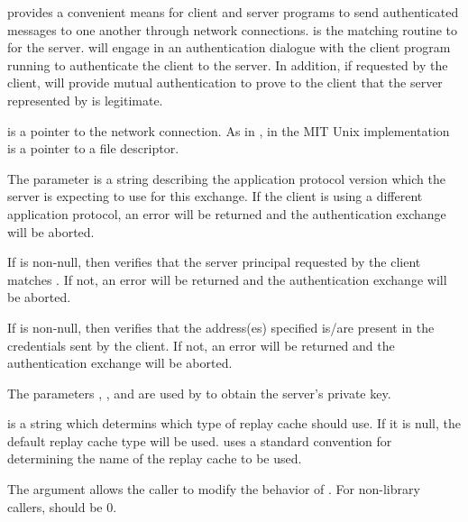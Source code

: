  provides a convenient means for client and
server programs to send authenticated messages to one another through
network connections.   is the matching routine
to  for the server.  
will engage in an authentication dialogue with the
client program running  to authenticate the
client to the server.  In addition, if requested by the client,
 will provide mutual authentication to
prove to the client that the server represented by
 is legitimate. 

 is a pointer to the network connection.  As in
, in the MIT Unix implementation
 is a pointer to a file descriptor.

The parameter  is a string describing the
application protocol version which the server is expecting to use for
this exchange.  If the client is using a different application protocol,
an error will be returned and the authentication exchange will be
aborted.

If  is non-null, then 
verifies that the server principal requested by the client matches
.  If not, an error will be returned and the
authentication exchange will be aborted.

If  is non-null, then 
verifies that the address(es) specified is/are present in the
credentials sent by the client.  If not, an error will be returned and
the authentication exchange will be aborted.

The parameters , , and
 are used by  to obtain the
server's private key.

 is a string which determins which type of replay
cache  should use.  If it is null, the default
replay cache type will be used.   uses a
standard convention for determining the name of the replay cache to be
used.

The  argument allows the caller to modify the behavior of
.  For non-library callers, 
should be 0. 


